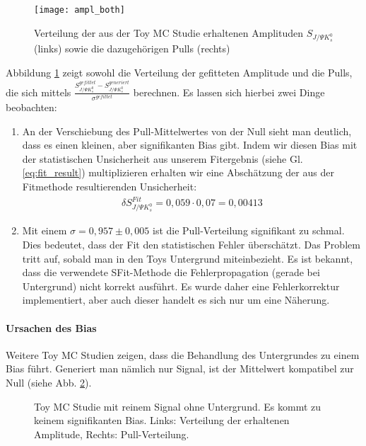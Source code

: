 \documentclass[a4paper]{scrbook}
\newcommand{\SJPsi}{S_{J/\Psi K_s^0}}
\begin{document}
\begin{figure}[hptb]
\centering
\texttt{[image: ampl\_both]}
\caption{Verteilung der aus der Toy MC Studie erhaltenen Amplituden $\SJPsi$ (links) sowie die dazugehörigen Pulls (rechts)}
\label{fig:fit_bias}
\end{figure}

Abbildung \ref{fig:fit_bias} zeigt sowohl die Verteilung der gefitteten Amplitude und die Pulls, die sich mittels $\frac{\SJPsi^{gefittet} - \SJPsi^{generiert}}{\sigma^{gefittet}}$ berechnen. Es lassen sich hierbei zwei Dinge beobachten:
\begin{enumerate}
    \item An der Verschiebung des Pull-Mittelwertes von der Null sieht man deutlich, dass es einen kleinen, aber signifikanten Bias gibt. Indem wir diesen Bias mit der statistischen Unsicherheit aus unserem Fitergebnis (siehe Gl. \ref{eq:fit_result}) multiplizieren erhalten wir eine Abschätzung der aus der Fitmethode resultierenden Unsicherheit:
        \begin{align}
        \delta\SJPsi^{Fit} = 0,059 \cdot 0,07 = 0,00413
        \end{align}

    \item Mit einem $\sigma = 0,957 \pm 0,005$ ist die Pull-Verteilung signifikant zu schmal. Dies bedeutet, dass der Fit den statistischen Fehler überschätzt. Das Problem tritt auf, sobald man in den Toys Untergrund miteinbezieht. Es ist bekannt, dass die verwendete SFit-Methode die Fehlerpropagation (gerade bei Untergrund) nicht korrekt ausführt. Es wurde daher eine Fehlerkorrektur implementiert, aber auch dieser handelt es sich nur um eine Näherung.
\end{enumerate}

\paragraph{Ursachen des Bias}
Weitere Toy MC Studien zeigen, dass die Behandlung des Untergrundes zu einem Bias führt. Generiert man nämlich nur Signal, ist der Mittelwert kompatibel zur Null (siehe Abb. \ref{fig:toys_no_bkg}).

\begin{figure}[hptb]
\centering
\caption{Toy MC Studie mit reinem Signal ohne Untergrund. Es kommt zu keinem signifikanten Bias. Links: Verteilung der erhaltenen Amplitude, Rechts: Pull-Verteilung.}
\label{fig:toys_no_bkg}
\end{figure}
\end{document}
